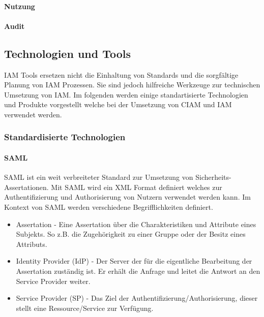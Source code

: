 \documentclass[12pt]{article}
\begin{document}
\paragraph{Nutzung}
\paragraph{Audit}
\subsection{Technologien und Tools}
IAM Tools ersetzen nicht die Einhaltung von Standards und die sorgfältige Planung von IAM Prozessen. Sie sind jedoch hilfreiche Werkzeuge zur technischen Umsetzung von IAM. Im folgenden werden einige standartisierte Technologien und Produkte vorgestellt welche bei der Umsetzung von CIAM und IAM verwendet werden.
\subsubsection{Standardisierte Technologien}
\paragraph{SAML}
SAML ist ein weit verbreiteter Standard zur Umsetzung von Sicherheits-Assertationen. Mit SAML wird ein XML Format definiert welches zur Authentifizierung und Authorisierung von Nutzern verwendet werden kann. Im Kontext von SAML werden verschiedene Begrifflichkeiten definiert.
\begin{itemize}
  \item Assertation - Eine Assertation über die Charakteristiken und Attribute eines Subjekts. So z.B. die Zugehörigkeit zu einer Gruppe oder der Besitz eines Attributs.
  \item Identity Provider (IdP) - Der Server der für die eigentliche Bearbeitung der Assertation zuständig ist. Er erhält die Anfrage und leitet die Antwort an den Service Provider weiter.
  \item Service Provider (SP) - Das Ziel der Authentifizierung/Authorisierung, dieser stellt eine Ressource/Service zur Verfügung.
\end{itemize}
~\cite{hughes2005security}
\end{document}
